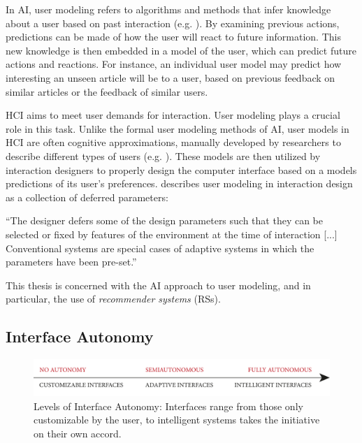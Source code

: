 In AI, user modeling refers to algorithms and methods that infer knowledge about a user based on past interaction 
(e.g. \cite{Pazzani2007, Smyth2007, Alshamri2008, Resnick1994}).
By examining previous actions, predictions can be made of how the user will react to future information. This new knowledge is then embedded in a model of the user, which can predict future actions and reactions. 
For instance, an individual user model may predict how interesting an unseen article will be to a user, based on previous feedback on similar articles or the feedback of similar users.

HCI aims to meet user demands for interaction. 
User modeling plays a crucial role in this task. 
Unlike the formal user modeling methods of AI, user models in HCI are often cognitive approximations, manually developed by researchers to describe different types of users 
(e.g. \cite{Fischer2001, Jameson2009, Cato2001}).
These models are then utilized by interaction designers to properly design the computer interface based on a models predictions of its user's preferences.
\cite{Totterdell1990} describes user modeling in interaction design as a collection of deferred parameters: 

\begin{blockquote}
  ``The designer defers some of the design parameters such that they can be selected or 
  fixed by features of the environment at the time of interaction [...] 
  Conventional systems are special cases of adaptive systems in which the parameters have been pre-set.'' 
\end{blockquote}

This thesis is concerned with the AI approach to user modeling, and in particular, the use of \emph{recommender systems} (RSs).

\subsection{Interface Autonomy}

\begin{figure}[t]
  \includegraphics[width=\textwidth]{../graphics/autonomy.pdf}
  \caption[Levels of Interface Autonomy]{
    Levels of Interface Autonomy:
    Interfaces range from those only customizable by the user, 
    to intelligent systems takes the initiative on their own accord.
  }
  \label{fig:autonomy}
\end{figure}

